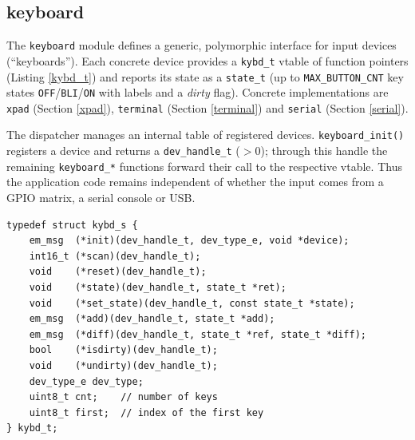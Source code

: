 \subsection{keyboard}\label{keyboard}
The \verb|keyboard| module defines a generic, polymorphic interface for input
devices (``keyboards''). Each concrete device provides a \verb|kybd_t| vtable
of function pointers (Listing \ref{kybd_t}) and reports its state as a
\verb|state_t| (up to \verb|MAX_BUTTON_CNT| key states \verb|OFF|/\verb|BLI|/\verb|ON|
with labels and a \emph{dirty} flag). Concrete implementations are \verb|xpad|
(Section \ref{xpad}), \verb|terminal| (Section \ref{terminal}) and
\verb|serial| (Section \ref{serial}).

The dispatcher manages an internal table of registered devices.
\verb|keyboard_init()| registers a device and returns a \verb|dev_handle_t|
($> 0$); through this handle the remaining \verb|keyboard_*| functions forward
their call to the respective vtable. Thus the application code remains
independent of whether the input comes from a GPIO matrix, a serial console or
USB.

\begin{listing}
\begin{verbatim}
typedef struct kybd_s {
    em_msg  (*init)(dev_handle_t, dev_type_e, void *device);
    int16_t (*scan)(dev_handle_t);
    void    (*reset)(dev_handle_t);
    void    (*state)(dev_handle_t, state_t *ret);
    void    (*set_state)(dev_handle_t, const state_t *state);
    em_msg  (*add)(dev_handle_t, state_t *add);
    em_msg  (*diff)(dev_handle_t, state_t *ref, state_t *diff);
    bool    (*isdirty)(dev_handle_t);
    void    (*undirty)(dev_handle_t);
    dev_type_e dev_type;
    uint8_t cnt;    // number of keys
    uint8_t first;  // index of the first key
} kybd_t;
\end{verbatim}
\caption{Device interface \texttt{kybd\_t}}
\label{kybd_t}
\end{listing}

